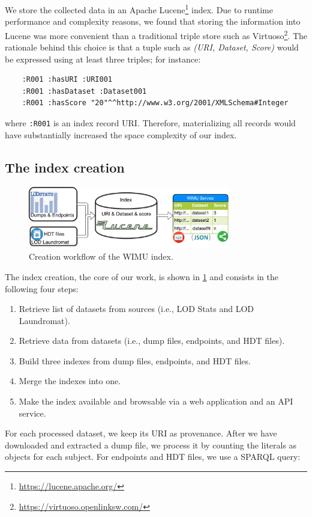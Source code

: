 We store the collected data in an Apache Lucene\footnote{\url{https://lucene.apache.org/}} index.
Due to runtime performance and complexity reasons, we found that storing the information into Lucene was more convenient than a traditional triple store such as Virtuoso\footnote{\url{https://virtuoso.openlinksw.com/}}.
The rationale behind this choice is that a tuple such as \emph{(URI, Dataset, Score)} would be expressed using at least three triples; for instance:
\begin{verbatim}
    :R001 :hasURI :URI001
    :R001 :hasDataset :Dataset001
    :R001 :hasScore "20"^^http://www.w3.org/2001/XMLSchema#Integer
\end{verbatim}
where \texttt{:R001} is an index record URI. Therefore, materializing all records would have substantially increased the space complexity of our index.

\subsection{The index creation}

\begin{figure}[htb] 
	\centering
	\includegraphics[width=250pt]{img/arq.pdf}
	\caption{Creation workflow of the WIMU index.}
	\label{fig:flow1}
\end{figure}

The index creation, the core of our work, is shown in \cref{fig:flow1} and consists in the following four steps:
\begin{enumerate}		
	\item Retrieve list of datasets from sources (i.e., LOD Stats and LOD Laundromat).
	\item Retrieve data from datasets (i.e., dump files, endpoints, and HDT files).
	\item Build three indexes from dump files, endpoints, and HDT files.
	\item Merge the indexes into one.
	\item Make the index available and browsable via a web application and an API service.
\end{enumerate}

For each processed dataset, we keep its URI as provenance.
After we have downloaded and extracted a dump file, we process it by counting the literals as objects for each subject.
For endpoints and HDT files, we use a SPARQL query:

